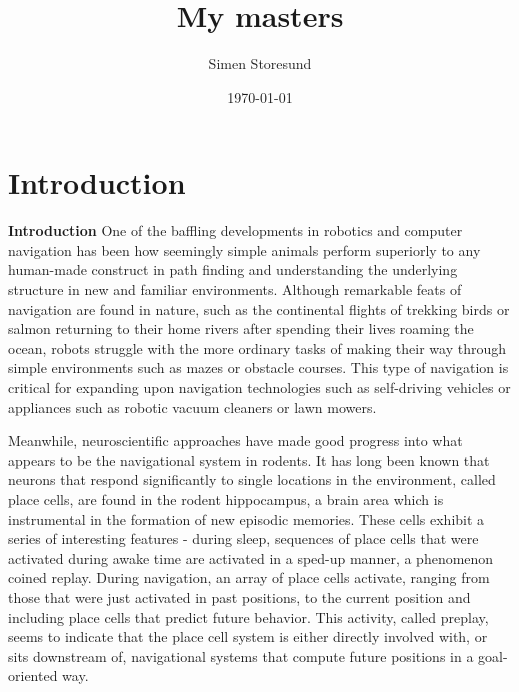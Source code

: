 \documentclass{article}
\title{My masters}
\author{Simen Storesund}
\date{\today}
\begin{document}
    \maketitle
    \section{Introduction}
    \textbf{Introduction} One of the baffling developments in robotics and computer navigation has been how seemingly simple animals perform superiorly to any human-made construct in path finding and understanding the underlying structure in new and familiar environments. Although remarkable feats of navigation are found in nature, such as the continental flights of trekking birds or salmon returning to their home rivers after spending their lives roaming the ocean, robots struggle with the more ordinary tasks of making their way through simple environments such as mazes or obstacle courses. This type of navigation is critical for expanding upon navigation technologies such as self-driving vehicles or appliances such as robotic vacuum cleaners or lawn mowers.

    Meanwhile, neuroscientific approaches have made good progress into what appears to be the navigational system in rodents. It has long been known that neurons that respond significantly to single locations in the environment, called place cells, are found in the rodent hippocampus, a brain area which is instrumental in the formation of new episodic memories. These cells exhibit a series of interesting features - during sleep, sequences of place cells that were activated during awake time are activated in a sped-up manner, a phenomenon coined replay. During navigation, an array of place cells activate, ranging from those that were just activated in past positions, to the current position and including place cells that predict future behavior. This activity, called preplay, seems to indicate that the place cell system is either directly involved with, or sits downstream of, navigational systems that compute future positions in a goal-oriented way.
    
\end{document}
